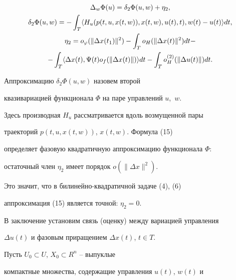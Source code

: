 \begin{gather}


\Delta_{w} \Phi(u)=\delta_{2} \Phi(u,w)+\eta_{2},\\


%


\delta_{2} \Phi(u,w)=- \int_{T} \langle 


H_{u} (p(t,u,x(t,w)), x(t,w), u(t), t), w(t) - u(t)\rangle dt,\\


%


\eta_{2}=o_{\varphi}(\| \Delta x(t_{1}) \|^{2}) - \int_{T}


o_{H} (\| \Delta x(t)\|^{2})dt -\notag\\


%


- \int_{T} \langle \Delta


x(t), \Psi(t)o_{f}(\| \Delta x(t)\|)\rangle dt - \int_{T}


o_{H}^{(2)}(\| \Delta u(t) \|)dt.\notag


\end{gather}





Аппроксимацию $\delta_{2} \Phi(u,w)$ назовем второй


квазивариацией функционала $\Phi$ на паре управлений $u$,~$w$.


Здесь производная $H_{u}$ рассматривается вдоль возмущенной пары


траекторий $p(t, u, x(t,w))$, $x(t,w)$. Формула (15)


определяет фазовую квадратичную аппроксимацию функционала $\Phi$:


остаточный член $\eta_{2}$ имеет порядок $o(\| \Delta x \|^{2})$.


Это значит, что в билинейно-квадратичной задаче (4), (6)


аппроксимация (15) является точной: $\eta_{2}=0$.





В заключение установим связь (оценку) между вариацией управления


$\Delta u(t)$ и фазовым приращением $\Delta x(t)$, $t \in T$.





Пусть $U_{0} \subset U$, $X_{0} \subset R^{n}$ -- выпуклые


компактные множества, содержащие управления $u(t)$, $w(t)$ и


